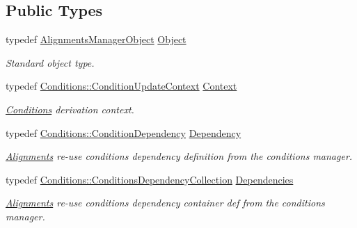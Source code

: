 \subsection*{Public Types}
\begin{DoxyCompactItemize}
\item 
typedef \hyperlink{class_d_d4hep_1_1_alignments_1_1_alignments_manager_object}{Alignments\+Manager\+Object} \hyperlink{class_d_d4hep_1_1_alignments_1_1_alignments_manager_a45f94880f4e49efe8e77ce6d8e45275f}{Object}
\begin{DoxyCompactList}\small\item\em Standard object type. \end{DoxyCompactList}\item 
typedef \hyperlink{class_d_d4hep_1_1_conditions_1_1_condition_update_context}{Conditions\+::\+Condition\+Update\+Context} \hyperlink{class_d_d4hep_1_1_alignments_1_1_alignments_manager_a6756d14a9af79dbc28296c765f6bf581}{Context}
\begin{DoxyCompactList}\small\item\em \hyperlink{namespace_d_d4hep_1_1_conditions}{Conditions} derivation context. \end{DoxyCompactList}\item 
typedef \hyperlink{class_d_d4hep_1_1_conditions_1_1_condition_dependency}{Conditions\+::\+Condition\+Dependency} \hyperlink{class_d_d4hep_1_1_alignments_1_1_alignments_manager_a62dad65e1472f8939e5a83f859e96d26}{Dependency}
\begin{DoxyCompactList}\small\item\em \hyperlink{namespace_d_d4hep_1_1_alignments}{Alignments} re-\/use conditions dependency definition from the conditions manager. \end{DoxyCompactList}\item 
typedef \hyperlink{class_d_d4hep_1_1_conditions_1_1_conditions_dependency_collection}{Conditions\+::\+Conditions\+Dependency\+Collection} \hyperlink{class_d_d4hep_1_1_alignments_1_1_alignments_manager_ae8068cb8b252db1243c87eccad69e980}{Dependencies}
\begin{DoxyCompactList}\small\item\em \hyperlink{namespace_d_d4hep_1_1_alignments}{Alignments} re-\/use conditions dependency container def from the conditions manager. \end{DoxyCompactList}\end{DoxyCompactItemize}

